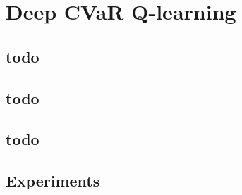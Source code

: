\chapter{Deep CVaR Q-learning}\label{ch:dqn}



\section{todo}


\section{todo}


\section{todo}


\section{Experiments}

